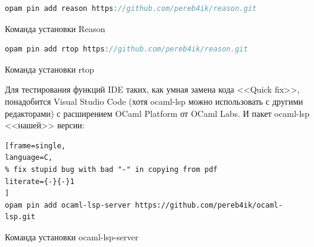 \lstset{basicstyle=\ttfamily}
\begin{example}
\begin{lstlisting}[frame=single,language=C]
opam pin add reason https://github.com/pereb4ik/reason.git
\end{lstlisting}
\caption{Команда установки Reason}
\end{example}
\begin{example}
\begin{lstlisting}[frame=single,language=C]
opam pin add rtop https://github.com/pereb4ik/reason.git
\end{lstlisting}
\caption{Команда установки rtop}
\end{example}
Для тестирования функций IDE таких, как умная замена кода <<Quick fix>>, понадобится Visual Studio Code (хотя ocaml-lsp можно использовать с другими редакторами) с расширением OCaml Platform от OCaml Labs. И пакет ocaml-lsp <<нашей>> версии:
\begin{example}
\begin{lstlisting}[frame=single,
language=C,
% fix stupid bug with bad "-" in copying from pdf
literate={-}{-}1
]
opam pin add ocaml-lsp-server https://github.com/pereb4ik/ocaml-lsp.git
\end{lstlisting}
\caption{Команда установки ocaml-lsp-server}
\end{example}